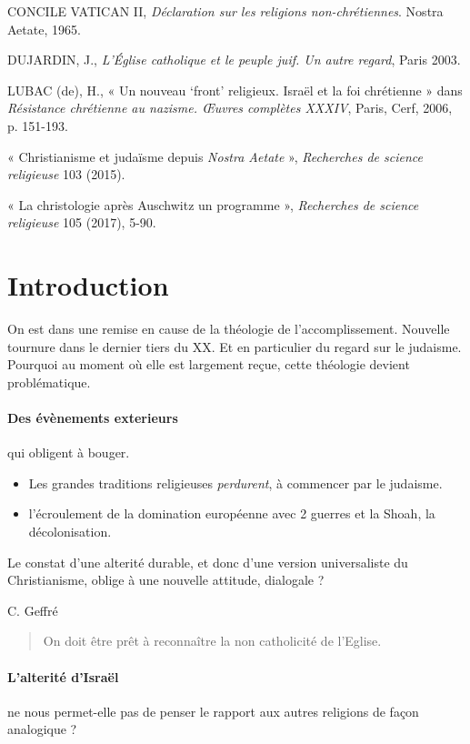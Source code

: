 CONCILE VATICAN II, \emph{Déclaration sur les religions
non-chrétiennes}. Nostra Aetate, 1965.

DUJARDIN, J., \emph{L'Église
catholique et le peuple juif. Un autre regard}, Paris 2003.

LUBAC (de), H., « Un nouveau `front' religieux. Israël et la foi
chrétienne » dans \emph{Résistance chrétienne au nazisme. Œuvres
complètes XXXIV}, Paris, Cerf, 2006, p. 151-193.

« Christianisme et judaïsme depuis \emph{Nostra Aetate} »,
\emph{Recherches de science religieuse} 103 (2015).

« La christologie après Auschwitz un programme », \emph{Recherches de
science religieuse} 105 (2017), 5-90.


\hypertarget{introduction}{%
\section{Introduction}\label{introduction}}

On est dans une remise en cause de la théologie de l'accomplissement. Nouvelle tournure dans le dernier tiers du XX. Et en particulier du regard sur le judaisme. Pourquoi au moment où elle est largement reçue, cette théologie devient problématique.

\paragraph{Des évènements exterieurs} qui obligent à bouger. 
\begin{itemize}
    \item Les grandes traditions religieuses \textit{perdurent}, à commencer par le judaisme. 
    \item l'écroulement de la domination européenne avec 2 guerres et la Shoah, la décolonisation. 
\end{itemize}

Le constat d'une alterité durable, et donc d'une version universaliste du Christianisme, oblige à une nouvelle attitude, dialogale ?

C. Geffré
\begin{quote}
    On doit être prêt à reconnaître la non catholicité de l'Eglise.
\end{quote}

\paragraph{L'alterité d'Israël} ne nous permet-elle pas de penser le rapport aux autres religions de façon analogique ? 
